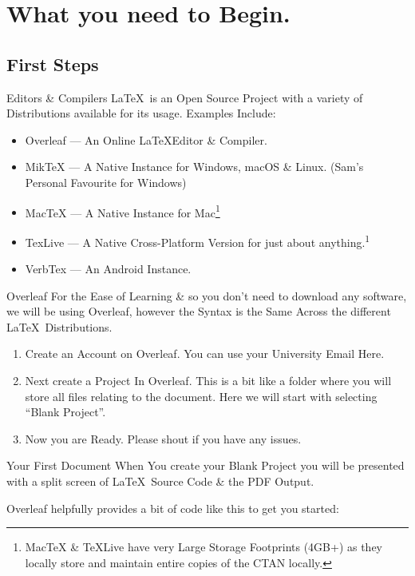 \documentclass{beamer}
\begin{document}
\section{What you need to Begin.}
\subsection{First Steps}
\begin{frame}{Editors \& Compilers}
\LaTeX~is an Open Source Project with a variety of Distributions available for its usage. Examples Include:\\
\begin{itemize}

\item Overleaf --- An Online \LaTeX Editor \& Compiler.
\item MikTeX --- A Native Instance for Windows, macOS \& Linux. (Sam's Personal Favourite for Windows)
\item MacTeX --- A Native Instance for Mac\footnote{MacTeX \& TeXLive have  very Large Storage Footprints (4GB+) as they locally store and maintain entire copies of the CTAN locally.{\label{fn1}}}
\item TexLive --- A Native Cross-Platform Version for just about anything.\textsuperscript{1}
\item VerbTex --- An Android Instance.

\end{itemize}
\end{frame}

\begin{frame}{Overleaf}
For the Ease of Learning \& so you don't need to download any software, we will be using Overleaf, however the Syntax is the Same Across the different \LaTeX~Distributions.
\begin{enumerate}
\item Create an Account on Overleaf. You can use your University Email Here.
\item Next create a Project In Overleaf. This is a bit like a folder where you will store all files relating to the document. Here we will start with selecting ``Blank Project''.
\item Now you are Ready. Please shout if you have any issues.
\end{enumerate}
\end{frame}


\begin{frame}{Your First Document}
When You create your Blank Project you will be presented with a split screen of \LaTeX~Source Code \& the PDF Output.\par Overleaf helpfully provides a bit of code like this to get you started:\\

\end{frame}
\end{document}
